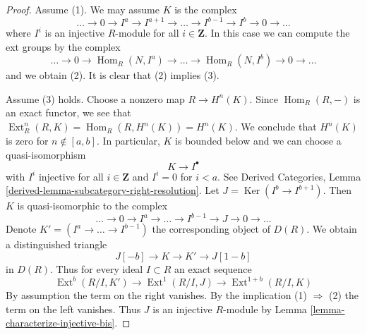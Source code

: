 \documentclass[10pt,a4paper]{amsart}
\theoremstyle{plain}
\theoremstyle{definition}
\theoremstyle{remark}
\numberwithin{equation}{subsection}
\def\Hom{\mathop{\mathrm{Hom}}\nolimits}
\def\Ext{\mathop{\mathrm{Ext}}\nolimits}
\def\Ker{\mathop{\mathrm{Ker}}}
\begin{document}
\begin{proof}
Assume (1). We may assume $K$ is the complex
$$
\ldots \to 0 \to I^a \to I^{a + 1} \to \ldots \to
I^{b - 1} \to I^b \to 0 \to \ldots
$$
where $I^i$ is an injective $R$-module for all $i \in \mathbf{Z}$.
In this case we can compute the ext groups by the complex
$$
\ldots \to 0 \to \Hom_R(N, I^a) \to \ldots \to
\Hom_R(N, I^b) \to 0 \to \ldots
$$
and we obtain (2). It is clear that (2) implies (3).

\medskip\noindent
Assume (3) holds. Choose a nonzero map $R \to H^n(K)$. Since $\Hom_R(R, -)$
is an exact functor, we see that
$\Ext^n_R(R, K) = \Hom_R(R, H^n(K)) = H^n(K)$.
We conclude that $H^n(K)$ is zero for $n \not \in [a, b]$.
In particular, $K$ is bounded below and we can choose a quasi-isomorphism
$$
K \to I^\bullet
$$
with $I^i$ injective for all $i \in \mathbf{Z}$ and
$I^i = 0$ for $i < a$. See Derived Categories, Lemma
\ref{derived-lemma-subcategory-right-resolution}.
Let $J = \Ker(I^b \to I^{b + 1})$. Then $K$ is quasi-isomorphic
to the complex
$$
\ldots \to 0 \to I^a \to \ldots \to I^{b - 1} \to J \to 0 \to \ldots
$$
Denote $K' = (I^a \to \ldots \to I^{b - 1})$ the corresponding object of
$D(R)$. We obtain a distinguished triangle
$$
J[-b] \to K \to K' \to J[1 - b]
$$
in $D(R)$. Thus for every ideal $I \subset R$ an exact sequence
$$
\Ext^b(R/I, K') \to \Ext^1(R/I, J) \to \Ext^{1 + b}(R/I, K)
$$
By assumption the term on the right vanishes. By the implication
(1) $\Rightarrow$ (2) the term on the left vanishes. Thus $J$
is an injective $R$-module by
Lemma \ref{lemma-characterize-injective-bis}.
\end{proof}
\end{document}
